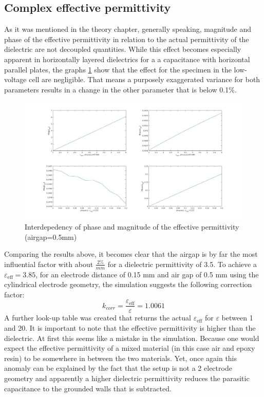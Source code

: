 \subsection{Complex effective permittivity}
As it was mentioned in the theory chapter, generally speaking, magnitude and phase of the effective permittivity in relation to the
actual permittivity of the dielectric are not decoupled quantities. While this effect becomes especially apparent in horizontally layered dielectrics for a
a capacitance with horizontal parallel plates, the graphs \ref{fig.complex} show that the effect for the specimen in the low-voltage cell are negligible. That means a purposely exaggerated variance for both parameters
results in a change in the other parameter that is below 0.1\%.

\begin{figure}[htbp]
	\centering
	\centerline{\includegraphics[width=\textwidth]{figures/Results/Complex/complex_permittivity_specimen}}		
	\caption[Kurze Abbildungsbeschreibung]{Interdepedency of phase and magnitude of the effective permittivity (airgap=0.5mm) } 
	\label{fig.complex}
\end{figure}


Comparing the results above, it becomes clear that the airgap is by
far the most influential factor with about $\frac{2\%}{mm}$ for a dielectric permittivity of 3.5.
To achieve a $\varepsilon_{\textrm{eff}}=3.85$, for an electrode distance of 0.15 mm and air gap of 0.5 mm using the
cylindrical electrode geometry, the simulation
suggests the following correction factor:
\begin{equation}
 k_{corr}=\frac{\varepsilon_{\textrm{eff}}}{\varepsilon}=1.0061
\end{equation}
A further look-up table was created that returns the actual $\varepsilon_{\textrm{eff}}$ for $\varepsilon$ between 1 and 20.
It is important to note that the effective permittivity is higher than the dielectric. At first this seems
like a mistake in the simulation. Because one would expect the effective permittivity of a 
mixed material (in this case air and epoxy resin) to be somewhere in between the two materials.
Yet, once again this anomaly can be explained by
the fact that the setup is not a 2 electrode geometry and apparently a higher dielectric permittivity
reduces the parasitic capacitance to the grounded walls that is subtracted.



